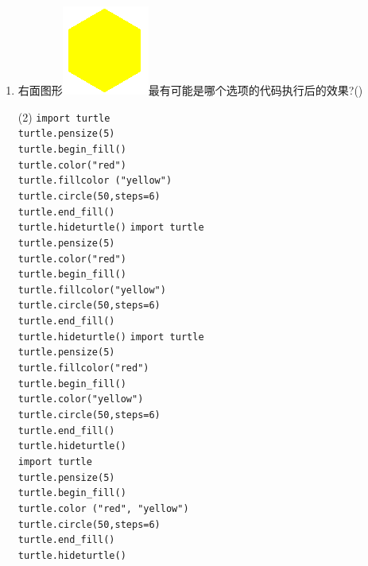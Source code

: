 \documentclass[11pt]{ctexart}
\begin{document}
\begin{enumerate}
        \newpage
        \item 右面图形\includegraphics[width=.05\textwidth]{20.png}最有可能是哪个选项的代码执行后的效果?(\qquad)
        \begin{tasks}(2)
            \task 
            \lstinline!import turtle!\\
            \lstinline!turtle.pensize(5)!\\
            \lstinline!turtle.begin_fill()!\\
            \lstinline!turtle.color("red")!\\
            \lstinline!turtle.fillcolor ("yellow")!\\
            \lstinline!turtle.circle(50,steps=6)!\\
            \lstinline!turtle.end_fill()!\\
            \lstinline!turtle.hideturtle()!
            \task 
            \lstinline!import turtle!\\
            \lstinline!turtle.pensize(5)!\\
            \lstinline!turtle.color("red")!\\
            \lstinline!turtle.begin_fill()!\\
            \lstinline!turtle.fillcolor("yellow")!\\
            \lstinline!turtle.circle(50,steps=6)!\\
            \lstinline!turtle.end_fill()!\\
            \lstinline!turtle.hideturtle()!
            \task 
            \lstinline!import turtle!\\
            \lstinline!turtle.pensize(5)!\\
            \lstinline!turtle.fillcolor("red")!\\
            \lstinline!turtle.begin_fill()!\\
            \lstinline!turtle.color("yellow")!\\
            \lstinline!turtle.circle(50,steps=6)!\\
            \lstinline!turtle.end_fill()!\\
            \lstinline!turtle.hideturtle()!\\
            \task 
            \lstinline!import turtle!\\
            \lstinline!turtle.pensize(5)!\\
            \lstinline!turtle.begin_fill()!\\
            \lstinline!turtle.color ("red", "yellow")!\\
            \lstinline!turtle.circle(50,steps=6)!\\
            \lstinline!turtle.end_fill()!\\
            \lstinline!turtle.hideturtle()!\\
        \end{tasks}


\end{enumerate}
\end{document}
